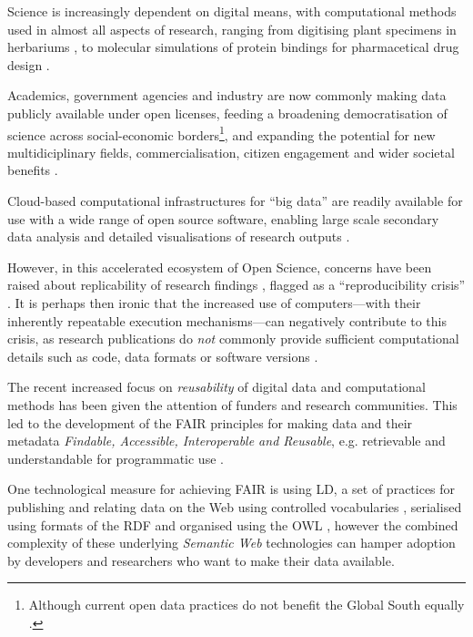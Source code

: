 Science is increasingly dependent on digital means, with computational methods used in almost all aspects of research, ranging from digitising plant specimens in herbariums \cite{Thiers 2016}, to molecular simulations of protein bindings for pharmacetical drug design \cite{Sledz 2018}. 

Academics, government agencies and industry are now commonly making data publicly available under open licenses, feeding a broadening democratisation of science \cite{Kitchin 2021} across social-economic borders\footnote{Although current open data practices do not benefit the Global South equally \cite{Serwadda 2018}.}, and expanding the potential for new multidiciplinary fields, commercialisation, citizen engagement and wider societal benefits \cite{Bisol 2014}.

Cloud-based computational infrastructures for ``big data'' are readily available for use with a wide range of open source software, enabling large scale secondary data analysis and detailed visualisations of research outputs \cite{Hashem 2015}.

However, in this accelerated ecosystem of Open Science, concerns have been raised about replicability of research findings \cite{Ioannidis 2005}, flagged as a ``reproducibility crisis'' \cite{Baker 2016}. It is perhaps then ironic that the increased use of computers---with their inherently repeatable execution mechanisms---can negatively contribute to this crisis, as research publications do \emph{not} commonly provide sufficient computational details such as code, data formats or software versions \cite{Stodden 2016}.

The recent increased focus on \emph{reusability} of digital data and computational methods has been given the attention of funders and research communities. This led to the development of the \acrshort{FAIR} principles for making data and their metadata \emph{Findable, Accessible, Interoperable and Reusable}, e.g. retrievable and understandable for programmatic use \cite{Wilkinson 2016}.

One technological measure for achieving FAIR is using \acrlong{LD}, a set of practices for publishing and relating data on the Web using controlled vocabularies \cite{Berners-Lee 2006}, serialised using formats of the \acrfull{RDF} \cite{Schreiber 2014} and organised using the \acrfull{OWL} \cite{W3C 2012}, however the combined complexity of these underlying \emph{Semantic Web} technologies can hamper adoption by developers \cite{Klímek 2019} and researchers who want to make their data available.

